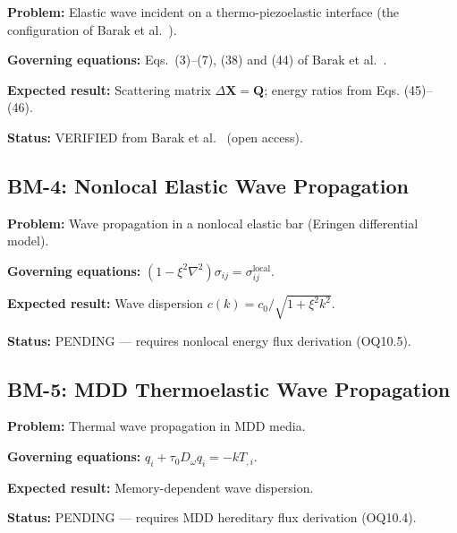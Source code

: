 \textbf{Problem:} Elastic wave incident on a thermo-piezoelastic interface (the configuration of Barak et al.~\cite{Barak2023}).

\textbf{Governing equations:} Eqs.~(3)--(7), (38) and (44) of Barak et al.~\cite{Barak2023}.

\textbf{Expected result:} Scattering matrix $\Delta\bm{X} = \bm{Q}$; energy ratios from Eqs. (45)--(46).

\textbf{Status:} VERIFIED from Barak et al.~\cite{Barak2023} (open access).

\subsection{BM-4: Nonlocal Elastic Wave Propagation}

\textbf{Problem:} Wave propagation in a nonlocal elastic bar (Eringen differential model).

\textbf{Governing equations:} $(1-\xi^2\nabla^2)\sigma_{ij} = \sigma_{ij}^{\text{local}}$.

\textbf{Expected result:} Wave dispersion $c(k) = c_0/\sqrt{1+\xi^2k^2}$.

\textbf{Status:} PENDING — requires nonlocal energy flux derivation (OQ10.5).

\subsection{BM-5: MDD Thermoelastic Wave Propagation}

\textbf{Problem:} Thermal wave propagation in MDD media.

\textbf{Governing equations:} $q_i + \tau_0 D_\omega q_i = -kT_{,i}$.

\textbf{Expected result:} Memory-dependent wave dispersion.

\textbf{Status:} PENDING — requires MDD hereditary flux derivation (OQ10.4).

